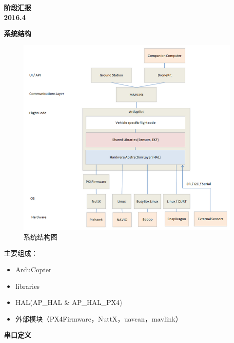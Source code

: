 \documentclass[a4paper,10pt]{ctexart} %
\begin{document}
\begin{center}
{\Large\textbf{阶段汇报}}\\	%
\textbf{2016.4}
\end{center}


\noindent \textbf{系统结构}\\
\begin{figure}[!htb]\center
\includegraphics[scale=0.5]{pics/1.png}		%
\caption{系统结构图}\label{figure1}
\end{figure}

主要组成：
\begin{itemize}
\item ArduCopter
\item libraries
\item HAL(AP\_HAL \& AP\_HAL\_PX4)
\item 外部模块（PX4Firmware，NuttX，uavcan，mavlink）
\end{itemize}

\vspace{20pt}
\noindent \textbf{串口定义}\\
\end{document}
